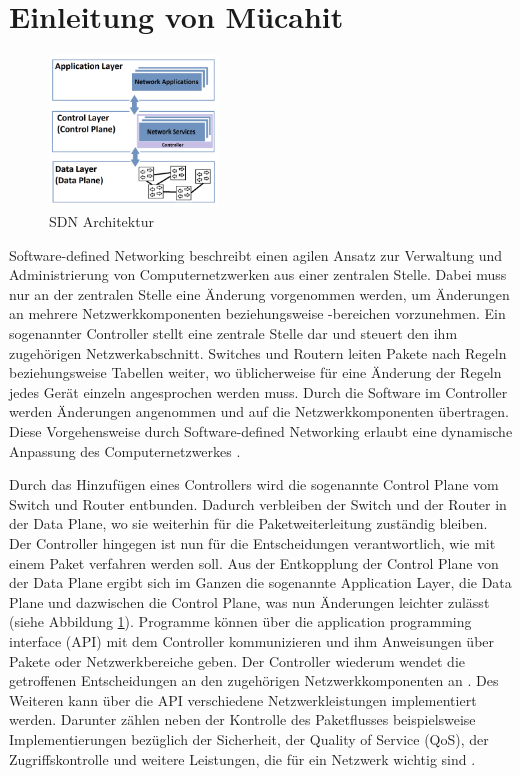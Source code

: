 \documentclass[fontsize=12pt,paper=a4,open=any,parskip=half,
  twoside=false,toc=listof,toc=bibliography,fleqn,leqno,
  captions=nooneline,captions=tableabove,british]{scrbook}
\begin{document}
\section*{Einleitung von Mücahit}\label{einl-müco}
\begin{figure}
	\vspace{-\baselineskip}
	\centering
	\includegraphics[width=0.4\textwidth]{Bilder/layer2}
	\caption{SDN Architektur}
	\label{layer2}
\end{figure}
Software-defined Networking beschreibt einen agilen Ansatz zur Verwaltung und Administrierung von Computernetzwerken aus einer zentralen Stelle. Dabei muss nur an der zentralen Stelle eine Änderung vorgenommen werden, um Änderungen an mehrere Netzwerkkomponenten beziehungsweise -bereichen vorzunehmen. Ein sogenannter Controller stellt eine zentrale Stelle dar und steuert den ihm zugehörigen Netzwerkabschnitt. Switches und Routern leiten Pakete nach Regeln beziehungsweise Tabellen weiter, wo üblicherweise für eine Änderung der Regeln jedes Gerät einzeln angesprochen werden muss. Durch die Software im Controller werden Änderungen angenommen und auf die Netzwerkkomponenten übertragen. Diese Vorgehensweise durch Software-defined Networking erlaubt eine dynamische Anpassung des Computernetzwerkes \cite[1-2]{sdn1}.\par 
Durch das Hinzufügen eines Controllers wird die sogenannte Control Plane vom Switch und Router entbunden. Dadurch verbleiben der Switch und der Router in der Data Plane, wo sie weiterhin für die Paketweiterleitung zuständig bleiben. Der Controller hingegen ist nun für die Entscheidungen verantwortlich, wie mit einem Paket verfahren werden soll. Aus der Entkopplung der Control Plane von der Data Plane ergibt sich im Ganzen die sogenannte Application Layer, die Data Plane und dazwischen die Control Plane, was nun Änderungen leichter zulässt (siehe Abbildung \ref{layer2}). Programme können über die application programming interface (API) mit dem Controller kommunizieren und ihm Anweisungen über Pakete oder Netzwerkbereiche geben. Der Controller wiederum wendet die getroffenen Entscheidungen an den zugehörigen Netzwerkkomponenten an \cite[2]{sdn2}. Des Weiteren kann über die API verschiedene Netzwerkleistungen implementiert werden. Darunter zählen neben der Kontrolle des Paketflusses beispielsweise Implementierungen bezüglich der Sicherheit, der Quality of Service (QoS), der Zugriffskontrolle und weitere Leistungen, die für ein Netzwerk wichtig sind \cite[8-9]{sdn2}. \par
\end{document}
